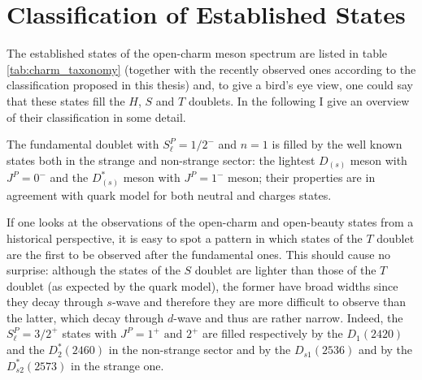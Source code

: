 \section{Classification of Established States}

The established states of the open-charm meson spectrum are listed in table \ref{tab:charm_taxonomy} (together with the recently observed ones according to the classification proposed in this thesis) and, to give a bird's eye view, one could say that these states fill the $H$, $S$ and $T$ doublets. In the following I give an overview of their classification in some detail.


The fundamental doublet with $S_\ell^P = 1/2^-$ and $n = 1$ is filled by the well known states both in the strange and non-strange sector: the lightest $D_{(s)}$ meson with $J^P = 0^-$ and the $D^*_{(s)}$ meson with $J^P = 1^-$ meson; their properties are in agreement with quark model for both neutral and charges states.

If one looks at the observations of the open-charm and open-beauty states from a historical perspective, it is easy to spot a pattern in which states of the $T$ doublet are the first to be observed after the fundamental ones. This should cause no surprise: although the states of the $S$ doublet are lighter than those of the $T$ doublet (as expected by the quark model), the former have broad widths since they decay through $s$-wave and therefore they are more difficult to observe than the latter, which decay through $d$-wave and thus are rather narrow. Indeed, the $S_\ell^P = \left. 3/2 \right.^+$ states with $J^P = 1^+ \text{ and } 2^+$ are filled respectively by the $D_1(2420)$ and the $D^*_2(2460)$ in the non-strange sector and by the $D_{s1}(2536)$ and by the $D^*_{s 2}(2573)$ in the strange one.

